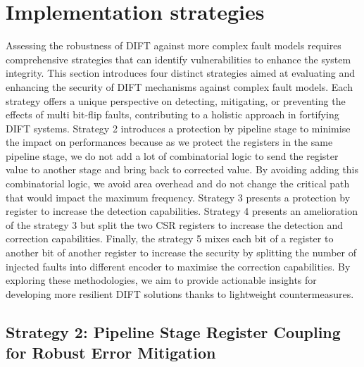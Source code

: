 \section{Implementation strategies}
\label{section:chap6_implem_strategies}

Assessing the robustness of DIFT against more complex fault models requires comprehensive strategies that can identify vulnerabilities to enhance the system integrity. This section introduces four distinct strategies aimed at evaluating and enhancing the security of DIFT mechanisms against complex fault models. Each strategy offers a unique perspective on detecting, mitigating, or preventing the effects of multi bit-flip faults, contributing to a holistic approach in fortifying DIFT systems.
Strategy 2 introduces a protection by pipeline stage to minimise the impact on performances because as we protect the registers in the same pipeline stage, we do not add a lot of combinatorial logic to send the register value to another stage and bring back to corrected value. By avoiding adding this combinatorial logic, we avoid area overhead and do not change the critical path that would impact the maximum frequency. Strategy 3 presents a protection by register to increase the detection capabilities. Strategy 4 presents an amelioration of the strategy 3 but split the two CSR registers to increase the detection and correction capabilities. Finally, the strategy 5 mixes each bit of a register to another bit of another register to increase the security by splitting the number of injected faults into different encoder to maximise the correction capabilities.
By exploring these methodologies, we aim to provide actionable insights for developing more resilient DIFT solutions thanks to lightweight countermeasures.

\subsection{Strategy 2: Pipeline Stage Register Coupling for Robust Error Mitigation}

